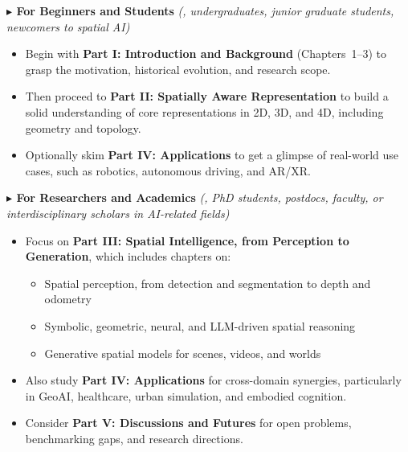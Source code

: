 


\vspace{1em}

\noindent\textbf{$\blacktriangleright$ For Beginners and Students} \textit{(\eg, undergraduates, junior graduate students, newcomers to spatial AI)}
\begin{itemize}[leftmargin=2em,itemsep=0.35em]
    \item Begin with \textbf{Part I: Introduction and Background} (Chapters~1--3) to grasp the motivation, historical evolution, and research scope.
    \item Then proceed to \textbf{Part II: Spatially Aware Representation} to build a solid understanding of core representations in 2D, 3D, and 4D, including geometry and topology.
    \item Optionally skim \textbf{Part IV: Applications} to get a glimpse of real-world use cases, such as robotics, autonomous driving, and AR/XR.
\end{itemize}

\vspace{0.5em}

\noindent\textbf{$\blacktriangleright$ For Researchers and Academics} \textit{(\eg, PhD students, postdocs, faculty, or interdisciplinary scholars in AI-related fields)}
\begin{itemize}[leftmargin=2em,itemsep=0.35em]
    \item Focus on \textbf{Part III: Spatial Intelligence, from Perception to Generation}, which includes chapters on:
    \begin{itemize}[leftmargin=2em,itemsep=0.35em]
        \item Spatial perception, from detection and segmentation to depth and odometry
        \item Symbolic, geometric, neural, and LLM-driven spatial reasoning
        \item Generative spatial models for scenes, videos, and worlds
    \end{itemize}
    \item Also study \textbf{Part IV: Applications} for cross-domain synergies, particularly in GeoAI, healthcare, urban simulation, and embodied cognition.
    \item Consider \textbf{Part V: Discussions and Futures} for open problems, benchmarking gaps, and research directions.
\end{itemize}

